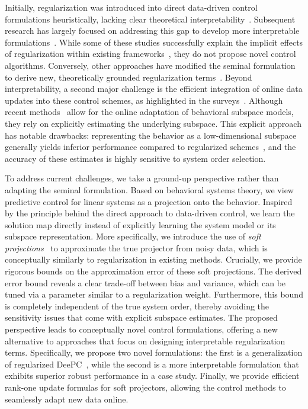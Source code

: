 \documentclass[letterpaper, 10 pt, conference]{ieeeconf}
\begin{document}
Initially, regularization was introduced into direct data-driven control formulations heuristically, lacking clear theoretical interpretability~\cite{coulson2019data}.
Subsequent research has largely focused on addressing this gap to develop more interpretable formulations~\cite{kladtke2023implicit,mattsson2024equivalence,dorfler2022bridging,breschi2023data,huang2023robust,sasfi2025gaussian}. 
While some of these studies successfully explain the implicit effects of regularization within existing frameworks~\cite{kladtke2023implicit,mattsson2024equivalence}, they do not propose novel control algorithms.
Conversely, other approaches have modified the seminal formulation~\cite{coulson2019data} to derive new, theoretically grounded regularization terms~\cite{breschi2023data,dorfler2022bridging}. 
Beyond interpretability, a second major challenge is the efficient integration of online data updates into these control schemes, as highlighted in the surveys~\cite{berberich2024overview,markovsky2021behavioral}.
Although recent methods~\cite{sasfi2025great,jin2025online} allow for the online adaptation of behavioral subspace models, they rely on explicitly estimating the underlying subspace. 
This explicit approach has notable drawbacks: representing the behavior as a low-dimensional subspace generally yields inferior performance compared to regularized schemes~\cite{markovsky2022ddinterpolation}, and the accuracy of these estimates is highly sensitive to system order selection.


To address current challenges, we take a ground-up perspective rather than adapting the seminal formulation. 
Based on behavioral systems theory, we view predictive control for linear systems as a projection onto the behavior.
Inspired by the principle behind the direct approach to data-driven control, we learn the solution map directly instead of explicitly learning the system model or its subspace representation.
More specifically, 
we introduce the use of \textit{soft projections}~\cite{wax2021detection,wax2022vector,wax2023robust} to approximate the true projector from noisy data, which is conceptually similarly to regularization in existing methods.
Crucially, we provide rigorous bounds on the approximation error of these soft projections.
The derived error bound reveals a clear trade-off between bias and variance, which can be tuned via a parameter similar to a regularization weight.
Furthermore, this bound is completely independent of the true system order, thereby avoiding the sensitivity issues that come with explicit subspace estimates.
The proposed perspective leads to conceptually novel control formulations, offering a new alternative to approaches that focus on designing interpretable regularization terms.
Specifically, we propose two novel formulations: the first is a generalization of regularized \acrfull{DeePC}~\cite{coulson2019data}, while the second is a more interpretable formulation that exhibits superior robust performance in a case study.
Finally, we provide efficient rank-one update formulas for soft projectors, allowing the control methods to seamlessly adapt new data online.
\end{document}
